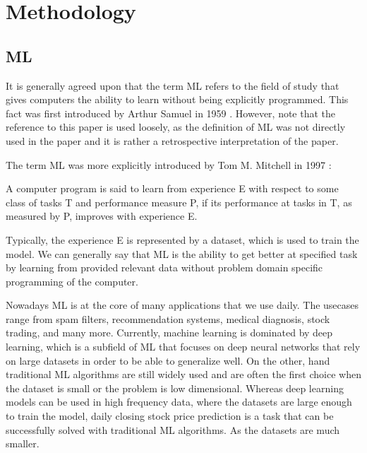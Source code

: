 \chapter{Methodology}
\label{chap:four}

\section{\acl{ML}}

It is generally agreed upon that the term 
\ac{ML} refers to the field of study that gives computers the ability to learn 
without being explicitly programmed. This fact was first 
introduced by Arthur Samuel in 1959 \cite{Samuel1959}. However, note that the reference to this paper is used
loosely, as the definition of \ac{ML} was not directly used in the paper and it is rather 
a retrospective interpretation of the paper. 

The term \ac{ML} was more explicitly introduced by Tom M. Mitchell in 1997 \cite{Mitchell1997}:

\begin{defin}\label{de:ml}
    A computer program is said to learn from experience E with respect
    to some class of tasks T and performance measure P, if its performance at tasks in
    T, as measured by P, improves with experience E. 
\end{defin}

Typically, the experience E is represented by a dataset, which is used to train the model. 
We can generally say that \ac{ML} is the ability to get better at specified task by learning
from provided relevant data without problem domain specific programming of the computer.


Nowadays \ac{ML} is at the core of many applications that we use daily. The usecases range from
spam filters, recommendation systems, medical diagnosis, stock trading, and many more. Currently, 
machine learning is dominated by deep learning, which is a subfield of \ac{ML} that focuses on
deep neural networks that rely on large datasets in order to be able to generalize well.
On the other, hand traditional \ac{ML} algorithms are still widely used and are often the first choice
when the dataset is small or the problem is low dimensional. Whereas deep learning models
can be used in high frequency data, where the datasets are large enough to train the model, 
daily closing stock price prediction is a task that can be successfully solved with 
traditional \ac{ML} algorithms. As the datasets are much smaller. 


